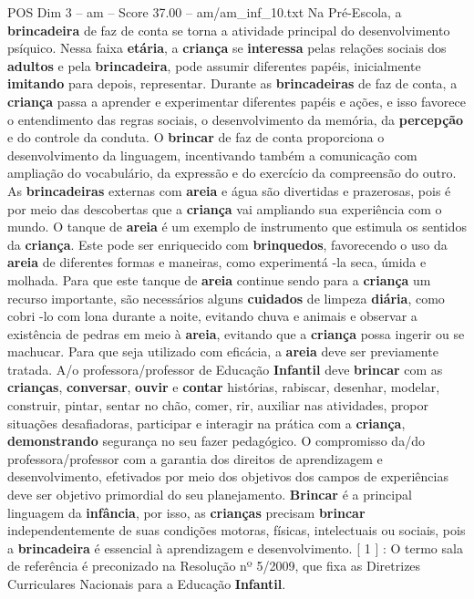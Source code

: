 \begin{textsample}{POS Dim 3 – am – Score 37.00 – am/am\_inf\_10.txt}
Na Pré-Escola, a \textbf{brincadeira} de faz de conta se torna a atividade principal do desenvolvimento psíquico.
Nessa faixa \textbf{etária}, a \textbf{criança} se \textbf{interessa} pelas relações sociais dos \textbf{adultos} e pela \textbf{brincadeira}, pode assumir diferentes papéis, inicialmente \textbf{imitando} para depois, representar.
Durante as \textbf{brincadeiras} de faz de conta, a \textbf{criança} passa a aprender e experimentar diferentes papéis e ações, e isso favorece o entendimento das regras sociais, o desenvolvimento da memória, da \textbf{percepção} e do controle da conduta.
O \textbf{brincar} de faz de conta proporciona o desenvolvimento da linguagem, incentivando também a comunicação com ampliação do vocabulário, da expressão e do exercício da compreensão do outro.
As \textbf{brincadeiras} externas com \textbf{areia} e água são divertidas e prazerosas, pois é por meio das descobertas que a \textbf{criança} vai ampliando sua experiência com o mundo.
O tanque de \textbf{areia} é um exemplo de instrumento que estimula os sentidos da \textbf{criança}.
Este pode ser enriquecido com \textbf{brinquedos}, favorecendo o uso da \textbf{areia} de diferentes formas e maneiras, como experimentá -la seca, úmida e molhada.
Para que este tanque de \textbf{areia} continue sendo para a \textbf{criança} um recurso importante, são necessários alguns \textbf{cuidados} de limpeza \textbf{diária}, como cobri -lo com lona durante a noite, evitando chuva e animais e observar a existência de pedras em meio à \textbf{areia}, evitando que a \textbf{criança} possa ingerir ou se machucar.
Para que seja utilizado com eficácia, a \textbf{areia} deve ser previamente tratada.
A/o professora/professor de Educação \textbf{Infantil} deve \textbf{brincar} com as \textbf{crianças}, \textbf{conversar}, \textbf{ouvir} e \textbf{contar} histórias, rabiscar, desenhar, modelar, construir, pintar, sentar no chão, comer, rir, auxiliar nas atividades, propor situações desafiadoras, participar e interagir na prática com a \textbf{criança}, \textbf{demonstrando} segurança no seu fazer pedagógico.
O compromisso da/do professora/professor com a garantia dos direitos de aprendizagem e desenvolvimento, efetivados por meio dos objetivos dos campos de experiências deve ser objetivo primordial do seu planejamento. \textbf{Brincar} é a principal linguagem da \textbf{infância}, por isso, as \textbf{crianças} precisam \textbf{brincar} independentemente de suas condições motoras, físicas, intelectuais ou sociais, pois a \textbf{brincadeira} é essencial à aprendizagem e desenvolvimento. [ 1 ] : O termo sala de referência é preconizado na Resolução nº 5/2009, que fixa as Diretrizes Curriculares Nacionais para a Educação \textbf{Infantil}.

\end{textsample}
